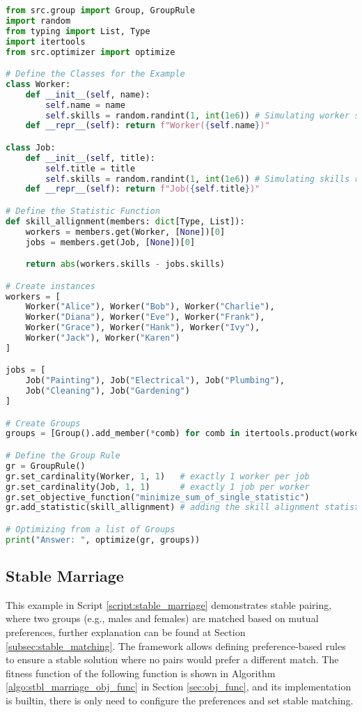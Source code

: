 \begin{lstlisting}[language=Python, caption={Creating and solving the Job Assignment Problem using this framework.}, label={script:job_assignement}]
from src.group import Group, GroupRule
import random
from typing import List, Type
import itertools
from src.optimizer import optimize

# Define the Classes for the Example
class Worker:
    def __init__(self, name):
        self.name = name
        self.skills = random.randint(1, int(1e6)) # Simulating worker skill level
    def __repr__(self): return f"Worker({self.name})"

class Job:
    def __init__(self, title):
        self.title = title
        self.skills = random.randint(1, int(1e6)) # Simulating skills required
    def __repr__(self): return f"Job({self.title})"

# Define the Statistic Function
def skill_allignment(members: dict[Type, List]):
    workers = members.get(Worker, [None])[0]
    jobs = members.get(Job, [None])[0]

    return abs(workers.skills - jobs.skills)

# Create instances
workers = [
    Worker("Alice"), Worker("Bob"), Worker("Charlie"),
    Worker("Diana"), Worker("Eve"), Worker("Frank"),
    Worker("Grace"), Worker("Hank"), Worker("Ivy"),
    Worker("Jack"), Worker("Karen")
]

jobs = [
    Job("Painting"), Job("Electrical"), Job("Plumbing"),
    Job("Cleaning"), Job("Gardening")
]

# Create Groups
groups = [Group().add_member(*comb) for comb in itertools.product(workers, jobs)]

# Define the Group Rule
gr = GroupRule()
gr.set_cardinality(Worker, 1, 1)   # exactly 1 worker per job
gr.set_cardinality(Job, 1, 1)      # exactly 1 job per worker
gr.set_objective_function("minimize_sum_of_single_statistic")
gr.add_statistic(skill_allignment) # adding the skill alignment statistic

# Optimizing from a list of Groups
print("Answer: ", optimize(gr, groups))
\end{lstlisting}


\subsection{Stable Marriage}
This example in Script \ref{script:stable_marriage} demonstrates stable pairing, where two groups (e.g., males and females) are matched based on mutual preferences, further explanation can be found at Section \ref{subsec:stable_matching}. The framework allows defining preference-based rules to ensure a stable solution where no pairs would prefer a different match.
The fitness function of the following function is shown in Algorithm \ref{algo:stbl_marriage_obj_func} in Section \ref{sec:obj_func}, and its implementation is builtin, there is only need to configure the preferences and set stable matching.

